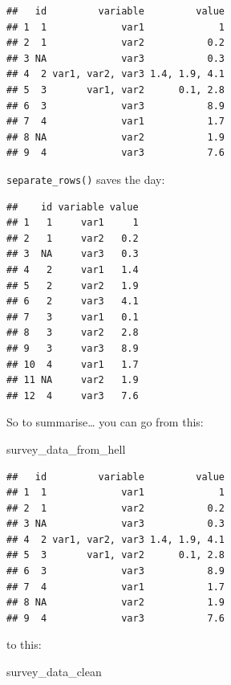 \documentclass[]{gitbook}
\newenvironment{Shaded}{\begin{snugshade}}{\end{snugshade}}
\newcommand{\KeywordTok}[1]{\textcolor[rgb]{0.13,0.29,0.53}{\textbf{#1}}}
\newcommand{\NormalTok}[1]{#1}
\newcommand{\OperatorTok}[1]{\textcolor[rgb]{0.81,0.36,0.00}{\textbf{#1}}}
\newcommand{\StringTok}[1]{\textcolor[rgb]{0.31,0.60,0.02}{#1}}
\begin{document}
\begin{verbatim}
##   id         variable         value
## 1  1             var1             1
## 2  1             var2           0.2
## 3 NA             var3           0.3
## 4  2 var1, var2, var3 1.4, 1.9, 4.1
## 5  3       var1, var2      0.1, 2.8
## 6  3             var3           8.9
## 7  4             var1           1.7
## 8 NA             var2           1.9
## 9  4             var3           7.6
\end{verbatim}

\texttt{separate\_rows()} saves the day:

\begin{Shaded}
\end{Shaded}

\begin{verbatim}
##    id variable value
## 1   1     var1     1
## 2   1     var2   0.2
## 3  NA     var3   0.3
## 4   2     var1   1.4
## 5   2     var2   1.9
## 6   2     var3   4.1
## 7   3     var1   0.1
## 8   3     var2   2.8
## 9   3     var3   8.9
## 10  4     var1   1.7
## 11 NA     var2   1.9
## 12  4     var3   7.6
\end{verbatim}

So to summarise\ldots{} you can go from this:

\begin{Shaded}
\begin{Highlighting}[]
\NormalTok{survey_data_from_hell}
\end{Highlighting}
\end{Shaded}

\begin{verbatim}
##   id         variable         value
## 1  1             var1             1
## 2  1             var2           0.2
## 3 NA             var3           0.3
## 4  2 var1, var2, var3 1.4, 1.9, 4.1
## 5  3       var1, var2      0.1, 2.8
## 6  3             var3           8.9
## 7  4             var1           1.7
## 8 NA             var2           1.9
## 9  4             var3           7.6
\end{verbatim}

to this:

\begin{Shaded}
\begin{Highlighting}[]
\NormalTok{survey_data_clean}
\end{Highlighting}
\end{Shaded}
\end{document}
